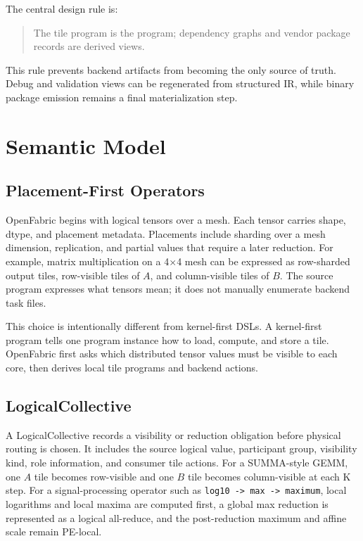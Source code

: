 \documentclass[conference]{IEEEtran}
\newcommand{\systemname}{OpenFabric}
\newcommand{\meshsize}{4$\times$4}
\begin{document}
The central design rule is:
\begin{quote}
The tile program is the program; dependency graphs and vendor package records
are derived views.
\end{quote}
This rule prevents backend artifacts from becoming the only source of truth.
Debug and validation views can be regenerated from structured IR, while binary
package emission remains a final materialization step.

\section{Semantic Model}

\subsection{Placement-First Operators}

\systemname{} begins with logical tensors over a mesh. Each tensor carries shape,
dtype, and placement metadata. Placements include sharding over a mesh dimension,
replication, and partial values that require a later reduction. For example,
matrix multiplication on a \meshsize{} mesh can be expressed as row-sharded
output tiles, row-visible tiles of $A$, and column-visible tiles of $B$. The
source program expresses what tensors mean; it does not manually enumerate
backend task files.

This choice is intentionally different from kernel-first DSLs. A kernel-first
program tells one program instance how to load, compute, and store a tile.
\systemname{} first asks which distributed tensor values must be visible to each
core, then derives local tile programs and backend actions.

\subsection{LogicalCollective}

A LogicalCollective records a visibility or reduction obligation before physical
routing is chosen. It includes the source logical value, participant group,
visibility kind, role information, and consumer tile actions. For a SUMMA-style
GEMM, one $A$ tile becomes row-visible and one $B$ tile becomes column-visible at
each K step. For a signal-processing operator such as
\texttt{log10 -> max -> maximum}, local logarithms and local maxima are computed
first, a global max reduction is represented as a logical all-reduce, and the
post-reduction maximum and affine scale remain PE-local.
\end{document}
